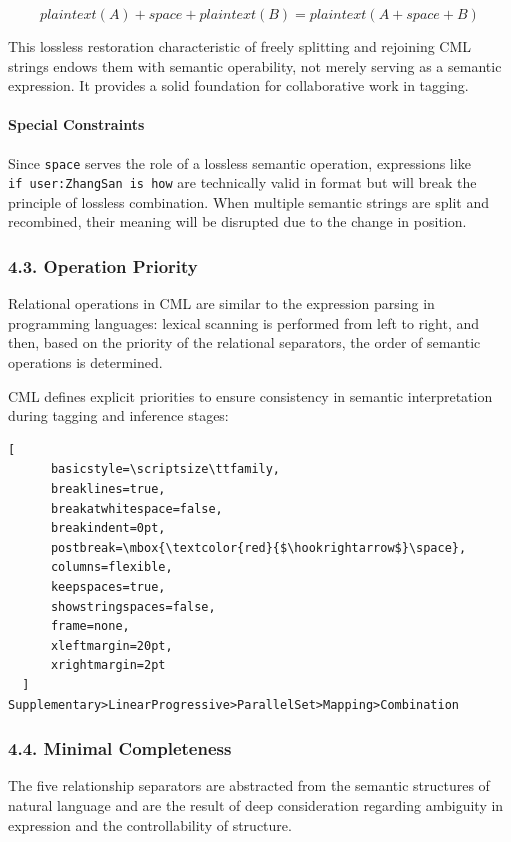 \documentclass[conference]{IEEEtran}
\begin{document}
\[plaintext(A)+space+plaintext(B) = plaintext(A+space+B)\]

This lossless restoration characteristic of freely splitting and
rejoining CML strings endows them with semantic operability, not merely
serving as a semantic expression. It provides a solid foundation for
collaborative work in tagging.

\paragraph{Special Constraints}\label{special-constraints-details}

Since \texttt{space} serves the role of a lossless semantic operation,
expressions like \texttt{if\ user:ZhangSan\ is\ how} are technically
valid in format but will break the principle of lossless combination.
When multiple semantic strings are split and recombined, their meaning
will be disrupted due to the change in position.

\subsubsection{4.3. Operation Priority}\label{43-operation-priority}

Relational operations in CML are similar to the expression parsing in
programming languages: lexical scanning is performed from left to right,
and then, based on the priority of the relational separators, the order
of semantic operations is determined.

CML defines explicit priorities to ensure consistency in semantic
interpretation during tagging and inference stages:

\begin{lstlisting}[
      basicstyle=\scriptsize\ttfamily,
      breaklines=true,
      breakatwhitespace=false,
      breakindent=0pt,
      postbreak=\mbox{\textcolor{red}{$\hookrightarrow$}\space},
      columns=flexible,
      keepspaces=true,
      showstringspaces=false,
      frame=none,
      xleftmargin=20pt,
      xrightmargin=2pt
  ]
Supplementary>LinearProgressive>ParallelSet>Mapping>Combination
  \end{lstlisting}

\subsubsection{4.4. Minimal Completeness}\label{44-minimal-completeness}

The five relationship separators are abstracted from the semantic
structures of natural language and are the result of deep consideration
regarding ambiguity in expression and the controllability of structure.
\end{document}
